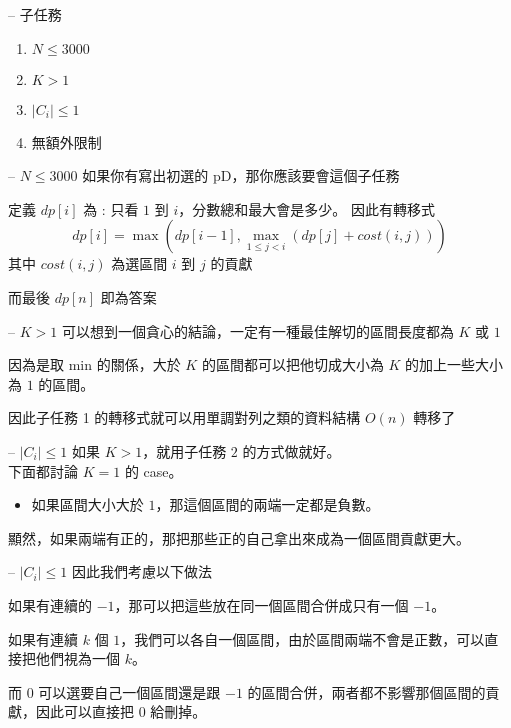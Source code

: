 \documentclass[hyperref,UTF8,notheorems,xcolor={dvipsnames}]{beamer}
\newcommand{\btitle}[1]{{\secname} -- #1}
\theoremstyle{definition}
\begin{document}
\begin{frame}[fragile]{\btitle{子任務}}
	\begin{enumerate}
		\item $N \le 3000$
		\item $K > 1$
		\item $|C_i| \le 1$
		\item 無額外限制
	\end{enumerate}
\end{frame}

\begin{frame}[fragile]{\btitle{$N \le 3000$}}
	如果你有寫出初選的 pD，那你應該要會這個子任務
	\pause

	定義 $dp[i]$ 為 : 只看 $1$ 到 $i$，分數總和最大會是多少。  
	因此有轉移式 $$dp[i] = \max(dp[i - 1], \max_{1 \le j < i}{(dp[j] + cost(i, j))})$$
	其中 $cost(i, j)$ 為選區間 $i$ 到 $j$ 的貢獻

	而最後 $dp[n]$ 即為答案
\end{frame}

\begin{frame}[fragile]{\btitle{$K > 1$}}
	可以想到一個貪心的結論，一定有一種最佳解切的區間長度都為 $K$ 或 $1$
	\pause

	因為是取 min 的關係，大於 $K$ 的區間都可以把他切成大小為 $K$ 的加上一些大小為 $1$ 的區間。

	因此子任務 1 的轉移式就可以用單調對列之類的資料結構 $O(n)$ 轉移了
\end{frame}

\begin{frame}[fragile]{\btitle{$|C_i| \le 1$}}
	如果 $K > 1$，就用子任務 $2$ 的方式做就好。 \\
	下面都討論 $K = 1$ 的 case。
	\pause

	\begin{itemize}
		\item 如果區間大小大於 $1$，那這個區間的兩端一定都是負數。 \\
	\end{itemize}
	\pause

	顯然，如果兩端有正的，那把那些正的自己拿出來成為一個區間貢獻更大。
	 


	
\end{frame}

\begin{frame}[fragile]{\btitle{$|C_i| \le 1$}}
	因此我們考慮以下做法
	
	如果有連續的 $-1$，那可以把這些放在同一個區間合併成只有一個 $-1$。
	\pause

	如果有連續 $k$ 個 $1$，我們可以各自一個區間，由於區間兩端不會是正數，可以直接把他們視為一個 $k$。
	\pause 

	而 $0$ 可以選要自己一個區間還是跟 $-1$ 的區間合併，兩者都不影響那個區間的貢獻，因此可以直接把 $0$ 給刪掉。
	
\end{frame}
\end{document}
